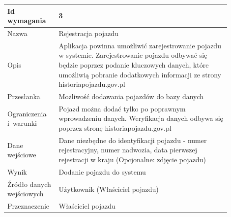 \documentclass[12pt]{article}
\begin{document}
\begin{table}[H]
\begin{center}
	\begin{tabular}{|p{0.18\linewidth}|p{0.72\linewidth}|}%
	\hline
	Id wymagania 	& 3 				\\ \hline
	Nazwa			& Rejestracja pojazdu \\ \hline
	Opis & Aplikacja powinna umożliwić zarejestrowanie pojazdu w systemie. Zarejestrowanie pojazdu odbywać się będzie poprzez podanie kluczowych danych, które umożliwią pobranie dodatkowych informacji ze strony historiapojazdu.gov.pl
\\ \hline
	Przesłanka & Możliwość dodawania pojazdów do bazy danych  \\ \hline
	Ograniczenia i~warunki & Pojazd można dodać tylko po poprawnym wprowadzeniu danych. Weryfikacja danych odbywa się poprzez stronę historiapojazdu.gov.pl  \\ \hline
	Dane wejściowe &
Dane niezbędne do identyfikacji pojazdu - numer rejestracyjny, numer nadwozia, data pierwszej rejestracji w kraju
(Opcjonalne: zdjęcie pojazdu)  \\ \hline
	Wynik & Dodanie pojazdu do systemu \\ \hline
	Źródło danych wejściowych & Użytkownik (Właściciel pojazdu) \\ \hline
	Przeznaczenie & Właściciel pojazdu \\ \hline
	\end{tabular}

\end{center}
\end{table}
\end{document}

